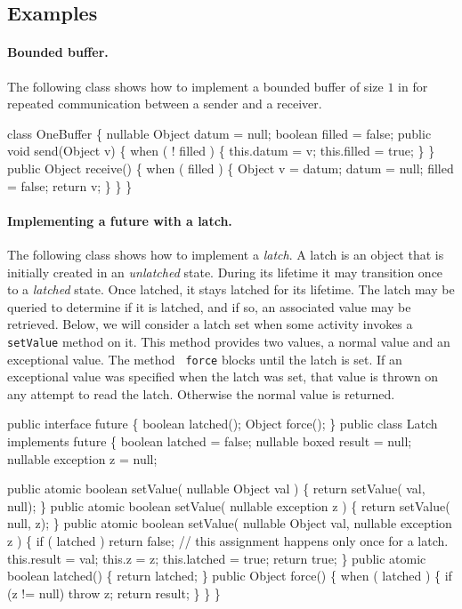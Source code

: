 {{\subsection{Examples}

\paragraph{Bounded buffer.}
The following class shows how to implement a bounded buffer of size
$1$ in \Xten{} for repeated communication between a sender and a
receiver.

\begin{x10}
class OneBuffer \{
  nullable Object datum = null;
  boolean filled = false;
  public 
     void send(Object v) \{
     when ( ! filled ) \{
       this.datum = v;
       this.filled = true;
    \}
 \}
  public
    Object receive() \{
      when ( filled ) \{
        Object v  = datum;
        datum = null;
        filled = false;
        return v;
      \}
  \}
\}
\end{x10}

\paragraph{ Implementing a future with a latch.}\label{future-imp}
The following class shows how to implement a {\em latch}. A latch is
an object that is initially created in an {\em unlatched}
state. During its lifetime it may transition once to a {\em latched}
state. Once latched, it stays latched for its lifetime. The latch may
be queried to determine if it is latched, and if so, an associated
value may be retrieved. Below, we will consider a latch set when some
activity invokes a {\tt setValue} method on it. This method provides
two values, a normal value and an exceptional value. The method {\tt
force} blocks until the latch is set. If an exceptional value was
specified when the latch was set, that value is thrown on any attempt
to read the latch. Otherwise the normal value is returned.

\begin{x10}
public interface future \{
   boolean latched();
   Object force();
\}
public class Latch implements future \{
  boolean latched = false;
  nullable boxed result = null;
  nullable exception z = null;

  public atomic boolean setValue( nullable Object val ) \{
   return setValue( val, null);
    \}
    public atomic boolean setValue( nullable exception z ) \{
        return setValue( null, z);
    \}
    public atomic boolean setValue( nullable Object val, 
                                    nullable exception z ) \{
        if ( latched ) return false;
        // this assignment happens only once for a latch.
        this.result = val;
        this.z = z;
        this.latched = true;
        return true;
    \}
    public atomic boolean latched() \{
        return latched;
    \}
    public Object force() \{
        when ( latched ) \{
            if (z != null) throw z;
            return result;
        \}
    \}
\}
\end{x10}

}}
